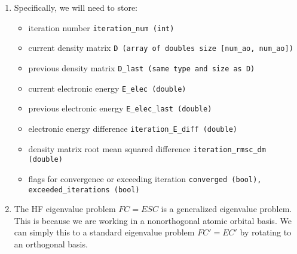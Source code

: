 \documentclass[12pt]{article}
\begin{document}
\begin{enumerate}
\item Specifically, we will need to store: 
\begin{itemize}
\item iteration number \texttt{iteration\_num (int)}
\item current density matrix \texttt{D (array of doubles size [num\_ao, num\_ao])}
\item previous density matrix \texttt{D\_last (same type and size as D)}
\item current electronic energy \texttt{E\_elec (double)}
\item previous electronic energy \texttt{E\_elec\_last (double)}
\item electronic energy difference \texttt{iteration\_E\_diff (double)}
\item density matrix root mean squared difference \texttt{iteration\_rmsc\_dm (double)}
\item flags for convergence or exceeding iteration \texttt{converged (bool), exceeded\_iterations (bool)}
\end{itemize}

\item The HF eigenvalue problem $FC = ESC$ is a generalized eigenvalue problem. This is because we are working in a nonorthogonal atomic orbital basis. We can simply this to a standard eigenvalue problem $FC' = EC'$ by rotating to an orthogonal basis.
\end{enumerate}

\section{}
\end{document}
